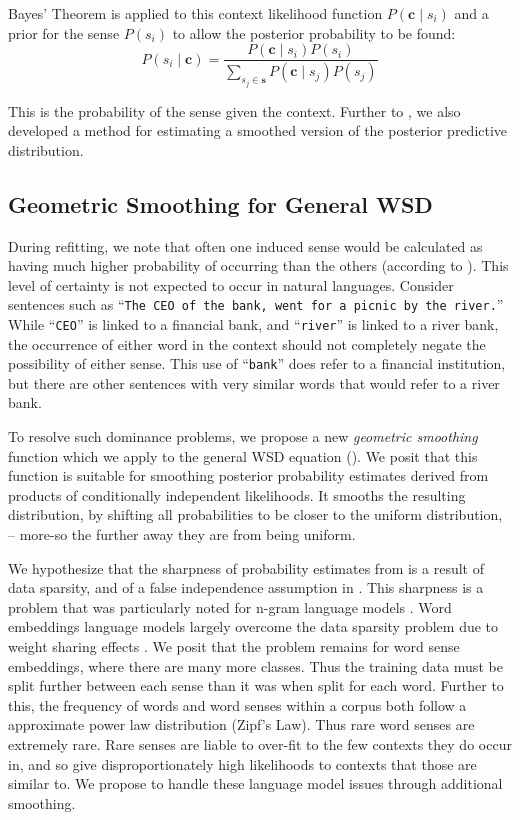 \documentclass{article}
\def\parencite{\cite}
\renewcommand{\c}{\mathbf{c}}
\newcommand{\s}{\mathbf{s}}
\newcommand{\wordquote}[1]{\enquote{\texttt{#1}}}
\begin{document}
Bayes' Theorem is applied to this context likelihood function  $P(\c \mid s_{i})$ and a prior for the sense $P(s_i)$ to allow the posterior probability to be found:
\begin{equation} \label{eq:generalwsd}
P(s_{i} \mid \c) =
\dfrac{P(\c \mid s_{i})P(s_{i})}
{\sum_{s_{j}\in\s} P(\c \mid s_{j})P(s_{j})}
\end{equation}

This is the probability of the sense given the context.
Further to , we also developed a method for estimating a smoothed version of the posterior predictive distribution.


\subsection{Geometric Smoothing for General WSD} \label{smoothing}


During refitting, we note that often one induced sense would be calculated as having much higher probability of occurring than the others (according to ).
This level of certainty is not expected to occur in natural languages. 
Consider sentences such as \wordquote{The CEO of the bank, went for a picnic by the river.} 
While \wordquote{CEO} is linked to a financial bank, and \wordquote{river} is linked to a river bank, the occurrence of either word in the context should not completely negate the possibility of either sense.
This use of \wordquote{bank} does refer to a financial institution, but there are other sentences with very similar words that would refer to a river bank.

To resolve such dominance problems, we propose a new \emph{geometric smoothing} function which we apply to the general WSD equation ().
We posit that this function is suitable for smoothing posterior probability estimates derived from products of conditionally independent likelihoods.
It smooths the resulting distribution, by shifting all probabilities to be closer to the uniform distribution,  -- more-so the further away they are from being uniform.

We hypothesize that the sharpness of probability estimates from  is a result of data sparsity, and of a false independence assumption in .
This sharpness is a problem that was particularly noted for n-gram language models \cite{rosenfeld2000two}.
Word  embeddings language models largely overcome the data sparsity problem due to weight sharing effects \parencite{NPLM}.
We posit that the problem remains for word sense embeddings, where there are many more classes.
Thus the training data must be split further between each sense than it was when split for each word. 
Further to this, the frequency of words \parencite{zipf1949human}  and word senses \parencite{Kilgarriff2004} within a corpus both follow a approximate power law distribution (Zipf's Law).
Thus rare word senses are extremely rare.
Rare senses are liable to over-fit to the few contexts they do occur in, and so give disproportionately high likelihoods to contexts that those are similar to.
We propose to handle these language model issues through additional smoothing.
\end{document}
